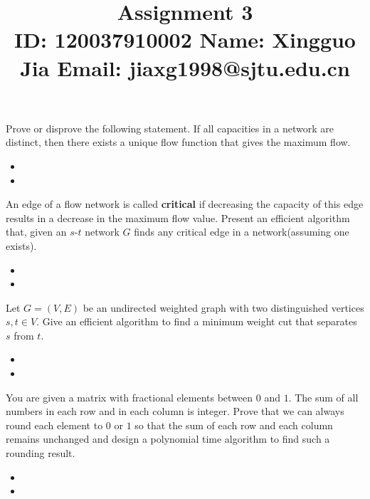 \documentclass{article}
\title{{\bf Assignment 3} \\ {\large ID: 120037910002 } {\large Name: Xingguo Jia } {\large Email: jiaxg1998@sjtu.edu.cn}}
\author{}
\date{}
\newcounter{exercise}
\newcommand{\<}{
    \langle}
\renewcommand{\>}{
    \rangle}
\begin{document}
\maketitle


{\large





\begin{exercise}
Prove or disprove the following statement. If all capacities in a network are distinct,
 then there exists a unique flow function that gives the maximum flow.
\end{exercise}
\begin{itemize}
    \item 
    \item 
\end{itemize}



\begin{exercise}
An edge of a flow network is called \textbf{critical} if decreasing the capacity of this edge results in a decrease in the maximum flow value. Present an efficient algorithm that, given an $s$-$t$ network $G$ finds any critical edge in a network(assuming one exists).
\end{exercise}
\begin{itemize}
    \item 
    \item 
\end{itemize}



\begin{exercise}
Let $G=(V,E)$ be an undirected weighted graph with two distinguished vertices $s,t\in V$. Give an efficient algorithm to find a minimum weight cut that separates $s$ from $t$.
\end{exercise}
\begin{itemize}
    \item 
    \item 
\end{itemize}



\begin{exercise}
You are given a matrix with fractional elements between $0$ and $1$. The sum of all numbers in each row and in each column is integer. Prove that we can always round each element to $0$ or $1$ so that the sum of each row and each column remains unchanged and design a polynomial time algorithm to find such a rounding result.
\end{exercise}
\begin{itemize}
    \item 
    \item 
\end{itemize}



}
\end{document}
